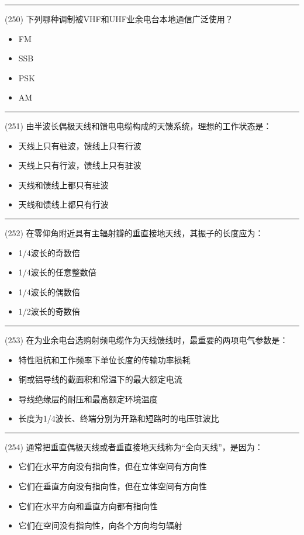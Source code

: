 \documentclass[twocolumn]{ctexart}  %
\begin{document}
\noindent\rule{0.5\textwidth}{1pt}
\heiti (250) 下列哪种调制被VHF和UHF业余电台本地通信广泛使用？ \songti {\color{gray} [LK1203] }
\begin{itemize}
	\item  FM
	\item  SSB
	\item  PSK
	\item  AM
\end{itemize}


\noindent\rule{0.5\textwidth}{1pt}
\heiti (251) 由半波长偶极天线和馈电电缆构成的天馈系统，理想的工作状态是： \songti {\color{gray} [LK0702] }
\begin{itemize}
	\item  天线上只有驻波，馈线上只有行波
	\item  天线上只有行波，馈线上只有驻波
	\item  天线和馈线上都只有驻波
	\item  天线和馈线上都只有行波
\end{itemize}


\noindent\rule{0.5\textwidth}{1pt}
\heiti (252) 在零仰角附近具有主辐射瓣的垂直接地天线，其振子的长度应为： \songti {\color{gray} [LK0904] }
\begin{itemize}
	\item  1/4波长的奇数倍
	\item  1/4波长的任意整数倍
	\item  1/4波长的偶数倍
	\item  1/2波长的奇数倍
\end{itemize}


\noindent\rule{0.5\textwidth}{1pt}
\heiti (253) 在为业余电台选购射频电缆作为天线馈线时，最重要的两项电气参数是： \songti {\color{gray} [LK0910] }
\begin{itemize}
	\item  特性阻抗和工作频率下单位长度的传输功率损耗
	\item  铜或铝导线的截面积和常温下的最大额定电流
	\item  导线绝缘层的耐压和最高额定环境温度
	\item  长度为1/4波长、终端分别为开路和短路时的电压驻波比
\end{itemize}


\noindent\rule{0.5\textwidth}{1pt}
\heiti (254) 通常把垂直偶极天线或者垂直接地天线称为“全向天线”，是因为： \songti {\color{gray} [LK0918] }
\begin{itemize}
	\item  它们在水平方向没有指向性，但在立体空间有方向性
	\item  它们在垂直方向没有指向性，但在立体空间有方向性
	\item  它们在水平方向和垂直方向都有指向性
	\item  它们在空间没有指向性，向各个方向均匀辐射
\end{itemize}
\end{document}
